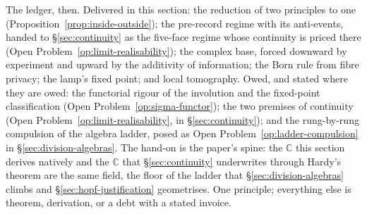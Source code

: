 The ledger, then. Delivered in this section: the reduction of two principles to one
(Proposition~\ref{prop:inside-outside}); the pre-record regime with its anti-events, handed to
\S\ref{sec:continuity} as the five-face regime whose continuity is priced there
(Open Problem~\ref{op:limit-realisability}); the complex base, forced downward by experiment and
upward by the additivity of information; the Born rule from fibre privacy; the lamp's fixed point;
and local tomography. Owed, and stated where they are owed: the functorial rigour of the involution
and the fixed-point classification (Open Problem~\ref{op:sigma-functor}); the two premises of
continuity (Open Problem~\ref{op:limit-realisability}, in \S\ref{sec:continuity}); and the
rung-by-rung compulsion of the algebra ladder, posed as Open
Problem~\ref{op:ladder-compulsion} in \S\ref{sec:division-algebras}. The
hand-on is the paper's spine: the $\mathbb{C}$ this section derives natively and the $\mathbb{C}$
that \S\ref{sec:continuity} underwrites through Hardy's theorem are the same field, the floor of
the ladder that \S\ref{sec:division-algebras} climbs and \S\ref{sec:hopf-justification}
geometrises. One principle; everything else is theorem, derivation, or a debt with a stated
invoice.
